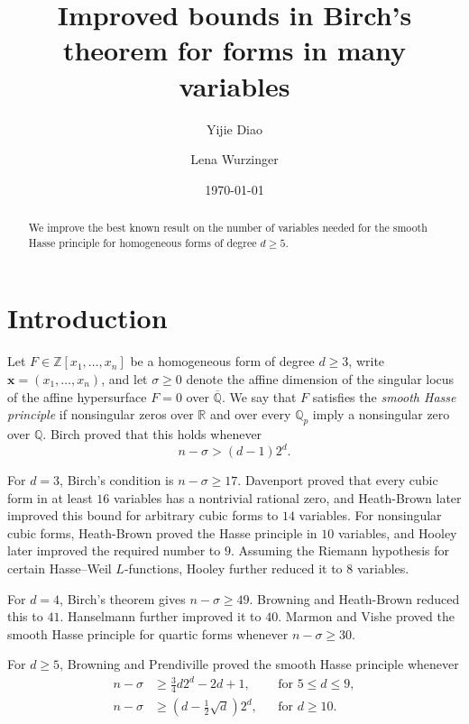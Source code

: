 \documentclass[reqno,a4paper,11pt]{amsart}
\title{Improved bounds in Birch's theorem for forms in many variables}
\author{Yijie Diao}
\author{Lena Wurzinger}
\date{\today}
\numberwithin{equation}{section}
\newcommand{\ZZ}{\mathbb Z}
\newcommand{\QQ}{\mathbb Q}
\newcommand{\RR}{\mathbb R}
\newcommand{\x}{\mathbf{x}}
\theoremstyle{plain}
\theoremstyle{definition}
\begin{document}
\begin{abstract}
We improve the best known result on the number of variables needed for the smooth Hasse principle for homogeneous forms of degree \(d\geq5\).
\end{abstract}

\maketitle
\thispagestyle{empty}
\setcounter{tocdepth}{1}
\tableofcontents

\section{Introduction}

Let \(F\in\ZZ[x_1,\ldots,x_n]\) be a homogeneous form of degree \(d\geq3\), write \(\x=(x_1,\ldots,x_n)\), and let \(\sigma\geq0\) denote the affine dimension of the singular locus of the affine hypersurface \(F=0\) over \(\overline{\QQ}\).
We say that \(F\) satisfies the \emph{smooth Hasse principle} if nonsingular zeros over \(\RR\) and over every \(\QQ_p\) imply a nonsingular zero over \(\QQ\).
Birch \cite{birch} proved that this holds whenever
\[
 n-\sigma>(d-1)2^d.
\]

For \(d=3\), Birch's condition is \(n-\sigma\geq17\).
Davenport \cite{davenport_cubic_16} proved that every cubic form in at least \(16\) variables has a nontrivial rational zero, and Heath-Brown \cite{heath_brown_cubic_14} later improved this bound for arbitrary cubic forms to \(14\) variables.
For nonsingular cubic forms, Heath-Brown \cite{heath_brown_cubic_10} proved the Hasse principle in \(10\) variables, and Hooley \cite{hooley_nonary_cubic} later improved the required number to \(9\).
Assuming the Riemann hypothesis for certain Hasse--Weil \(L\)-functions, Hooley \cite{hooley_octonary_cubic} further reduced it to \(8\) variables.

For \(d=4\), Birch's theorem gives \(n-\sigma\geq49\).
Browning and Heath-Brown \cite{browning_heath_brown_quartic} reduced this to \(41\).
Hanselmann \cite{hanselmann_quartic} further improved it to \(40\).
Marmon and Vishe \cite[Theorem~1.1]{marmon_vishe_quartic} proved the smooth Hasse principle for quartic forms whenever \(n-\sigma\geq30\).

For \(d\geq5\), Browning and Prendiville \cite[Theorems~1.1 and~1.2]{bp} proved the smooth Hasse principle whenever
\[
 \begin{aligned}
 n-\sigma&\geq \frac34d2^d-2d + 1,
 &&\text{for }5\leq d\leq9,\\
 n-\sigma&\geq\left(d-\frac12\sqrt d\right)2^d,
 &&\text{for }d\geq10.
 \end{aligned}
\]
\end{document}
